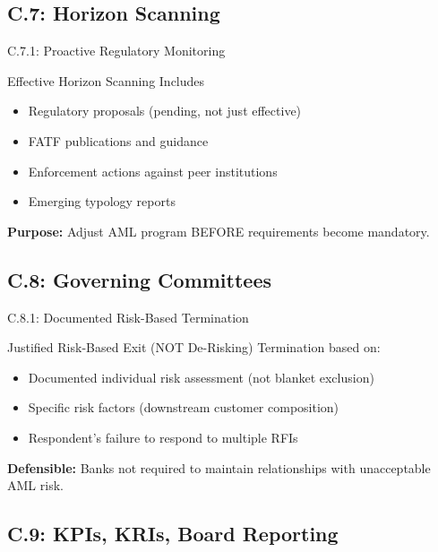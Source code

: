 \documentclass{beamer}
\begin{document}
	\subsection{C.7: Horizon Scanning}
	
	\begin{frame}{C.7.1: Proactive Regulatory Monitoring}
		\begin{block}{Effective Horizon Scanning Includes}
			\begin{itemize}
				\item Regulatory proposals (pending, not just effective)
				\item FATF publications and guidance
				\item Enforcement actions against peer institutions
				\item Emerging typology reports
			\end{itemize}
		\end{block}
		\textbf{Purpose:} Adjust AML program BEFORE requirements become mandatory.
	\end{frame}
	
	\subsection{C.8: Governing Committees}
	
	\begin{frame}{C.8.1: Documented Risk-Based Termination}
		\begin{block}{Justified Risk-Based Exit (NOT De-Risking)}
			Termination based on:
			\begin{itemize}
				\item Documented individual risk assessment (not blanket exclusion)
				\item Specific risk factors (downstream customer composition)
				\item Respondent's failure to respond to multiple RFIs
			\end{itemize}
		\end{block}
		\textbf{Defensible:} Banks not required to maintain relationships with unacceptable AML risk.
	\end{frame}
	
	\subsection{C.9: KPIs, KRIs, Board Reporting}
	
\end{document}
